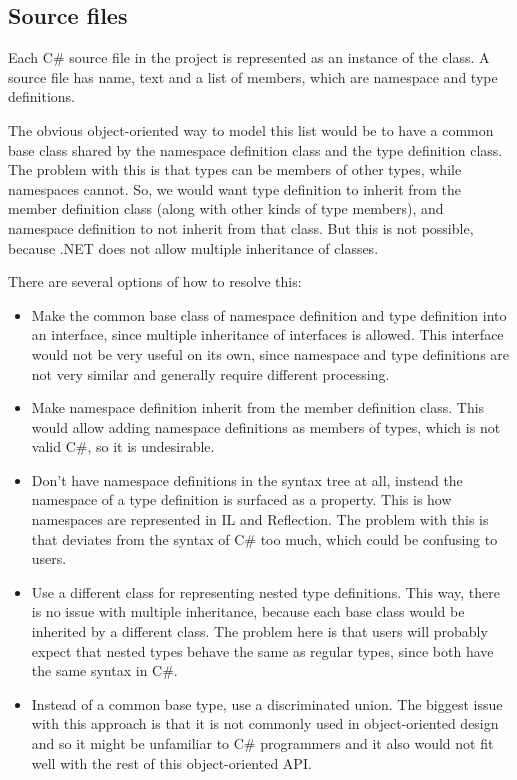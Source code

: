 \subsection{Source files}

Each C\# source file in the project is represented as an instance of the  class. A source file has name, text and a list of members, which are namespace and type definitions.

\medskip

The obvious object-oriented way to model this list would be to have a common base class shared by the namespace definition class and the type definition class. The problem with this is that types can be members of other types, while namespaces cannot. So, we would want type definition to inherit from the member definition class (along with other kinds of type members), and namespace definition to not inherit from that class. But this is not possible, because .NET does not allow multiple inheritance of classes.

There are several options of how to resolve this:

\begin{itemize}
\item Make the common base class of namespace definition and type definition into an interface, since multiple inheritance of interfaces is allowed. This interface would not be very useful on its own, since namespace and type definitions are not very similar and generally require different processing.
\item Make namespace definition inherit from the member definition class. This would allow adding namespace definitions as members of types, which is not valid C\#, so it is undesirable.
\item Don't have namespace definitions in the syntax tree at all, instead the namespace of a type definition is surfaced as a property. This is how namespaces are represented in \ac{IL} and Reflection. The problem with this is that deviates from the syntax of C\# too much, which could be confusing to users.
\item Use a different class for representing nested type definitions. This way, there is no issue with multiple inheritance, because each base class would be inherited by a different class. The problem here is that users will probably expect that nested types behave the same as regular types, since both have the same syntax in C\#.
\item Instead of a common base type, use a discriminated union. The biggest issue with this approach is that it is not commonly used in object-oriented design and so it might be unfamiliar to C\# programmers and it also would not fit well with the rest of this object-oriented \ac{API}.
\end{itemize}

